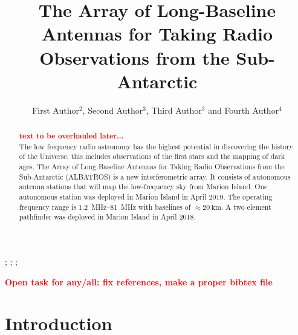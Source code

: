 \documentclass{ws-jai}
\begin{document}
\catchline{}{}{}{}{} %


\title{The Array of Long-Baseline Antennas for Taking Radio
  Observations from the Sub-Antarctic}

\author{First Author$^{2}$, Second Author$^{3}$, Third Author$^{3}$ and Fourth Author$^{4}$}

\address{
$^{2}$Department, University Name, City, State ZIP/Zone, Country, fauthor@university.com\\
$^{3}$Group, Company, Address, City, State ZIP/Zone, Country\\
$^{4}$Group, Company, Address, City, State ZIP/Zone, Country, fauthor@company.com
}

\maketitle


\begin{history}
;
;
;
\end{history}

\begin{abstract}
\textcolor{red}{\bf text to be overhauled later...} \\
The low frequency radio astronomy has the highest potential in
discovering the history of the Universe, this includes observations
of the first stars and the mapping of dark ages. The Array of Long
Baseline Antennas for Taking Radio Observations from the
Sub-Antarctic (ALBATROS) is a new interferometric array. It consists
of autonomous antenna stations that will map the low-frequency sky
from Marion Island. One autonomous station was deployed in Marion
Island in April 2019. The operating frequency range is
\SIrange{1.2}{81}{\MHz} with baselines of $\approx \SI{20}{\km}$. A
two element pathfinder was deployed in Marion Island in April
2018.
\end{abstract}


\textcolor{red}{\bf Open task for any/all: fix references, make a proper bibtex file}

\section{Introduction}
\end{document}
